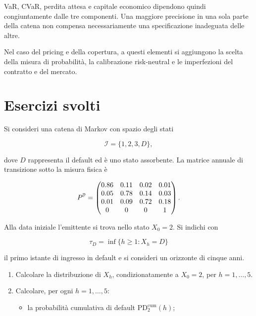 VaR, CVaR, perdita attesa e capitale economico dipendono quindi
congiuntamente dalle tre componenti. Una maggiore precisione in una
sola parte della catena non compensa necessariamente una
specificazione inadeguata delle altre.

Nel caso del pricing e della copertura, a questi elementi si aggiungono
la scelta della misura di probabilit\`{a}, la calibrazione
risk-neutral e le imperfezioni del contratto e del mercato.

\section{Esercizi svolti}

\label{sec:cap09-esercizi-svolti}

\begin{exercise}

\label{ex:cap09-term-structure-default}

Si consideri una catena di Markov con spazio degli stati

\[
\mathcal{I}=\{1,2,3,D\},
\]

dove $D$ rappresenta il default ed \`{e} uno stato assorbente. La
matrice annuale di transizione sotto la misura fisica \`{e}

\[
P^{\mathbb{P}}
=
\begin{pmatrix}
0.86 & 0.11 & 0.02 & 0.01\\
0.05 & 0.78 & 0.14 & 0.03\\
0.01 & 0.09 & 0.72 & 0.18\\
0    & 0    & 0    & 1
\end{pmatrix}.
\]

Alla data iniziale l'emittente si trova nello stato $X_0=2$. Si
indichi con

\[
\tau_D
=
\inf\{h\geq 1:X_h=D\}
\]

il primo istante di ingresso in default e si consideri un orizzonte
di cinque anni.

\begin{enumerate}

\item Calcolare la distribuzione di $X_h$, condizionatamente a $X_0=2$,
per $h=1,\ldots,5$.

\item Calcolare, per ogni $h=1,\ldots,5$:

\begin{itemize}

\item la probabilit\`{a} cumulativa di default
$\mathrm{PD}_{2}^{\mathrm{cum}}(h)$;


\end{itemize}
\end{enumerate}
\end{exercise}
